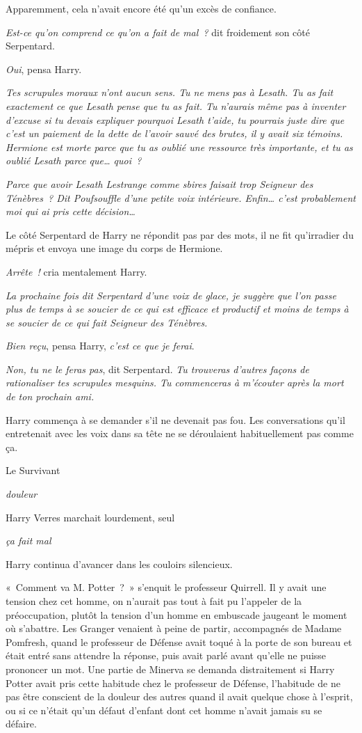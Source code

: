 Apparemment, cela n'avait encore été qu'un excès de confiance.

\emph{Est-ce qu'on comprend ce qu'on a fait de mal~?} dit froidement son côté Serpentard.

\emph{Oui}, pensa Harry.

\emph{Tes scrupules moraux n'ont aucun sens.
Tu ne mens pas à Lesath.
Tu as fait exactement ce que Lesath pense que tu as fait.
Tu n'aurais même pas à inventer d'excuse si tu devais expliquer pourquoi Lesath t'aide, tu pourrais juste dire que c'est un paiement de la dette de l'avoir sauvé des brutes, il y avait six témoins.
Hermione est morte parce que tu as oublié une ressource très importante, et tu as oublié Lesath parce que… quoi~?}

\emph{Parce que avoir Lesath Lestrange comme sbires faisait trop Seigneur des Ténèbres~?
Dit Poufsouffle d'une petite voix intérieure.
Enfin… c'est probablement moi qui ai pris cette décision…}

Le côté Serpentard de Harry ne répondit pas par des mots, il ne fit qu'irradier du mépris et envoya une image du corps de Hermione.

\emph{Arrête~!} cria mentalement Harry.

\emph{La prochaine fois dit Serpentard d'une voix de glace, je suggère que l'on passe plus de temps à se soucier de ce qui est efficace et productif et moins de temps à se soucier de ce qui fait Seigneur des Ténèbres.}

\emph{Bien reçu}, pensa Harry, \emph{c'est ce que je ferai}.

\emph{Non, tu ne le feras pas}, dit Serpentard.
\emph{Tu trouveras d'autres façons de rationaliser tes scrupules mesquins.
Tu commenceras à m'écouter après la mort de ton prochain ami.}

Harry commença à se demander s'il ne devenait pas fou.
Les conversations qu'il entretenait avec les voix dans sa tête ne se déroulaient habituellement pas comme ça.

Le Survivant

\emph{douleur}

Harry Verres marchait lourdement, seul

\emph{ça fait mal}

Harry continua d'avancer dans les couloirs silencieux.

\later

«~Comment va M. Potter~?~»
s'enquit le professeur Quirrell.
Il y avait une tension chez cet homme, on n'aurait pas tout à fait pu l'appeler de la préoccupation, plutôt la tension d'un homme en embuscade jaugeant le moment où s'abattre.
Les Granger venaient à peine de partir, accompagnés de Madame Pomfresh, quand le professeur de Défense avait toqué à la porte de son bureau et était entré sans attendre la réponse, puis avait parlé avant qu'elle ne puisse prononcer un mot.
Une partie de Minerva se demanda distraitement si Harry Potter avait pris cette habitude chez le professeur de Défense, l'habitude de ne pas être conscient de la douleur des autres quand il avait quelque chose à l'esprit, ou si ce n'était qu'un défaut d'enfant dont cet homme n'avait jamais su se défaire.

